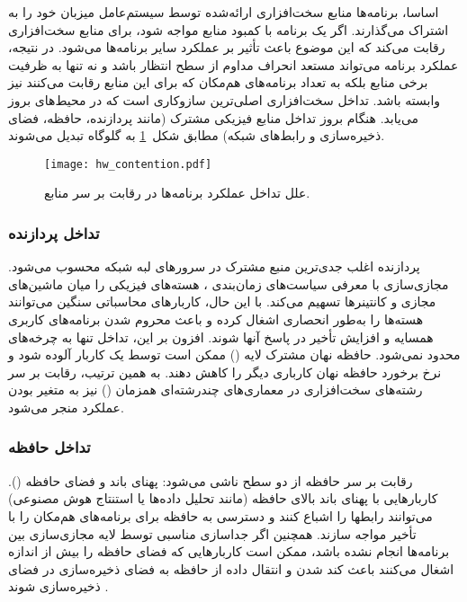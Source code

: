 اساسا، برنامه‌ها منابع سخت‌افزاری ارائه‌شده توسط سیستم‌‌عامل میزبان خود را به اشتراک می‌گذارند. اگر یک برنامه با کمبود منابع مواجه شود، برای منابع سخت‌افزاری رقابت می‌کند که این موضوع باعث تأثیر بر عملکرد سایر برنامه‌ها می‌شود. در نتیجه، عملکرد برنامه می‌تواند مستعد انحراف مداوم از سطح انتظار باشد و نه تنها به ظرفیت برخی منابع بلکه به تعداد برنامه‌های هم‌مکان که برای این منابع رقابت می‌کنند نیز وابسته باشد. تداخل سخت‌افزاری اصلی‌ترین سازوکاری است که در محیط‌های  بروز می‌یابد. هنگام بروز تداخل منابع فیزیکی مشترک (مانند پردازنده‌، حافظه، فضای ذخیره‌سازی و رابط‌های شبکه) مطابق شکل~\ref{figure:hardware_contention} به گلوگاه تبدیل می‌شوند.

\vspace{0.5cm}
\begin{figure}[h]
\centering
\texttt{[image: hw\_contention.pdf]}
\caption{علل تداخل عملکرد برنامه‌ها در رقابت بر سر منابع\cite{sa2019Survey}.}
\label{figure:hardware_contention}
\end{figure}
\vspace{0.5cm}

\subsubsection{تداخل پردازنده}

پردازنده اغلب جدی‌ترین منبع مشترک در سرورهای لبه شبکه محسوب می‌شود. مجازی‌سازی با معرفی سیاست‌های زمان‌بندی ، هسته‌های فیزیکی را میان ماشین‌های مجازی و کانتینرها تسهیم‌ می‌کند. با این حال، کاربارهای محاسباتی سنگین می‌توانند هسته‌ها را به‌طور انحصاری اشغال کرده و باعث محروم شدن برنامه‌های کاربری همسایه و افزایش تأخیر در پاسخ آنها شوند. افزون بر این، تداخل تنها به چرخه‌های  محدود نمی‌شود. حافظه نهان مشترک لایه () ممکن است توسط یک کاربار آلوده شود و نرخ برخورد حافظه نهان کارباری دیگر را کاهش دهند. به همین ترتیب، رقابت بر سر رشته‌های سخت‌افزاری در معماری‌های چندرشته‌ای همزمان ()  نیز به متغیر بودن عملکرد منجر می‌شود.

\subsubsection{تداخل حافظه}

رقابت بر سر حافظه از دو سطح ناشی می‌شود: پهنای باند و فضای حافظه (). کاربارهایی با پهنای باند بالای حافظه (مانند تحلیل داده‌ها یا استنتاج هوش مصنوعی) می‌توانند رابطها را اشباع کنند و دسترسی به حافظه برای برنامه‌های هم‌مکان را با تأخیر مواجه سازند. همچنین اگر جداسازی مناسبی توسط لایه مجازی‌سازی بین برنامه‌ها انجام نشده باشد، ممکن است کاربارهایی که فضای حافظه را بیش از اندازه اشغال می‌کنند باعث کند شدن و انتقال داده از حافظه به فضای ذخیره‌سازی  در فضای ذخیره‌سازی  شوند \cite{pu2010iointerference}.

